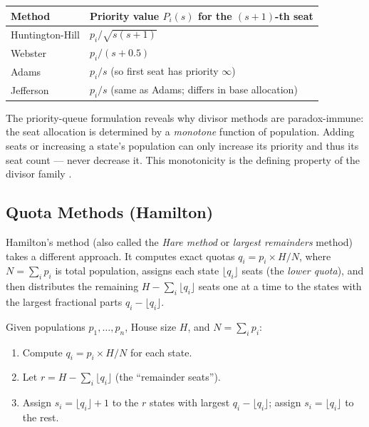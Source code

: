 \begin{center}
\begin{tabular}{ll}
\toprule
Method & Priority value $P_i(s)$ for the $(s+1)$-th seat \\
\midrule
Huntington-Hill & $p_i / \sqrt{s(s+1)}$ \\
Webster         & $p_i / (s + 0.5)$ \\
Adams           & $p_i / s$ \quad (so first seat has priority $\infty$) \\
Jefferson       & $p_i / s$ \quad (same as Adams; differs in base allocation) \\
\bottomrule
\end{tabular}
\end{center}

The priority-queue formulation reveals why divisor methods are paradox-immune:
the seat allocation is determined by a \emph{monotone} function of population.
Adding seats or increasing a state's population can only increase its priority
and thus its seat count --- never decrease it.
This monotonicity is the defining property of the divisor family
\citep{balinski1982fair}.

\subsection{Quota Methods (Hamilton)}

Hamilton's method (also called the \emph{Hare method} or \emph{largest
remainders} method) takes a different approach.
It computes exact quotas $q_i = p_i \times H / N$, where $N = \sum_i p_i$
is total population, assigns each state $\lfloor q_i \rfloor$ seats
(the \emph{lower quota}), and then distributes the remaining
$H - \sum_i \lfloor q_i \rfloor$ seats one at a time to the states
with the largest fractional parts $q_i - \lfloor q_i \rfloor$.

\begin{definition}
  Given populations $p_1, \ldots, p_n$, House size $H$, and
  $N = \sum_i p_i$:
  \begin{enumerate}
    \item Compute $q_i = p_i \times H / N$ for each state.
    \item Let $r = H - \sum_i \lfloor q_i \rfloor$ (the ``remainder seats'').
    \item Assign $s_i = \lfloor q_i \rfloor + 1$ to the $r$ states
      with largest $q_i - \lfloor q_i \rfloor$; assign
      $s_i = \lfloor q_i \rfloor$ to the rest.
  \end{enumerate}
\end{definition}

